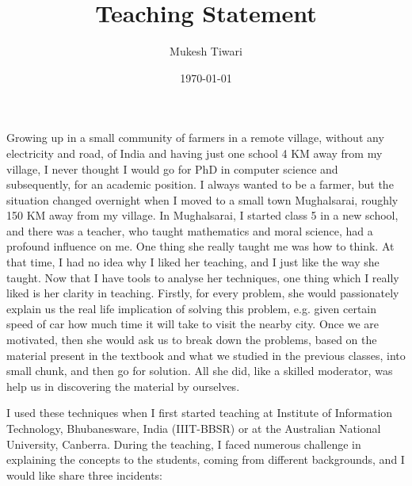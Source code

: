 \documentclass[a4paper]{article}
\title{Teaching Statement}
\author{Mukesh Tiwari}
\date{\today}
\begin{document}
\fontsize{12}{15}
\selectfont
\maketitle


Growing up in a small community of farmers in a remote village, without any electricity and road, of India and having just one school 
4 KM away from my village, I never thought I would go for PhD in computer science and subsequently, for an academic 
position. I always wanted to be a farmer, but the situation changed overnight when I moved to a small town Mughalsarai, roughly 150 KM away from my village. 
In Mughalsarai, I started class  5 in a new school, and there was a teacher, who taught mathematics and moral science, 
had a profound influence on me. One thing she really taught me was how to think. At that time, I had no idea why 
I liked her teaching, and I just like the way she taught.  Now that I have tools to analyse her techniques, one 
thing which I really liked is her clarity in teaching. Firstly, for every problem, she would passionately explain us the real life 
implication of solving this problem, e.g. given certain speed of car how much time it will take to visit the nearby city. 
Once we are motivated, then she would ask us to break down the 
problems, based on the material present in the textbook and what we studied in the previous classes, 
into small chunk, and then go for solution. All she did, like a skilled moderator,  was help us in discovering the material by 
ourselves. 

I used these techniques when I first started teaching at  Institute of Information Technology, Bhubanesware, India (IIIT-BBSR)
or at the Australian National University, Canberra. 
During the teaching, I faced numerous challenge in explaining the concepts to the students, coming from 
different backgrounds, and I would like share three incidents: 
\end{document}
